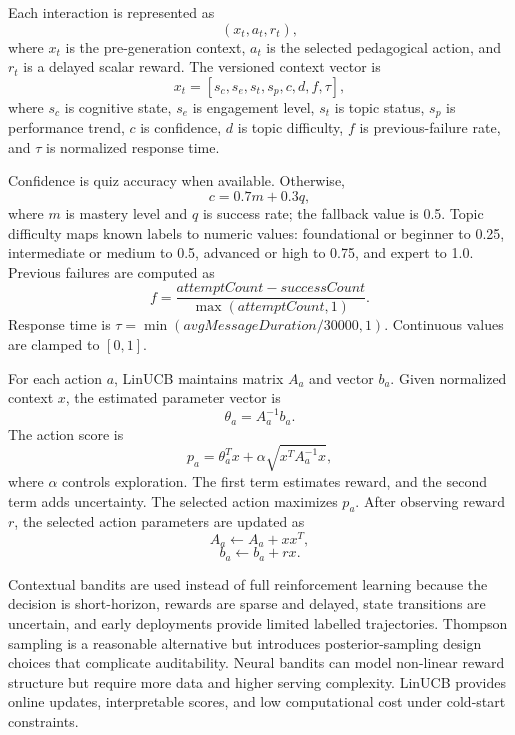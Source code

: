 \documentclass[conference]{IEEEtran}
\begin{document}
Each interaction is represented as
\begin{equation}
(x_t, a_t, r_t),
\end{equation}
where $x_t$ is the pre-generation context, $a_t$ is the selected pedagogical action, and $r_t$ is a delayed scalar reward. The versioned context vector is
\begin{equation}
x_t = [s_c, s_e, s_t, s_p, c, d, f, \tau],
\end{equation}
where $s_c$ is cognitive state, $s_e$ is engagement level, $s_t$ is topic status, $s_p$ is performance trend, $c$ is confidence, $d$ is topic difficulty, $f$ is previous-failure rate, and $\tau$ is normalized response time.

Confidence is quiz accuracy when available. Otherwise,
\begin{equation}
c = 0.7m + 0.3q,
\end{equation}
where $m$ is mastery level and $q$ is success rate; the fallback value is 0.5. Topic difficulty maps known labels to numeric values: foundational or beginner to 0.25, intermediate or medium to 0.5, advanced or high to 0.75, and expert to 1.0. Previous failures are computed as
\begin{equation}
f = \frac{attemptCount - successCount}{\max(attemptCount, 1)}.
\end{equation}
Response time is $\tau = \min(avgMessageDuration/30000, 1)$. Continuous values are clamped to $[0, 1]$.

For each action $a$, LinUCB maintains matrix $A_a$ and vector $b_a$. Given normalized context $x$, the estimated parameter vector is
\begin{equation}
\theta_a = A_a^{-1} b_a.
\end{equation}
The action score is
\begin{equation}
p_a = \theta_a^T x + \alpha \sqrt{x^T A_a^{-1}x},
\end{equation}
where $\alpha$ controls exploration. The first term estimates reward, and the second term adds uncertainty. The selected action maximizes $p_a$. After observing reward $r$, the selected action parameters are updated as
\begin{equation}
A_a \leftarrow A_a + xx^T,
\end{equation}
\begin{equation}
b_a \leftarrow b_a + rx.
\end{equation}

Contextual bandits are used instead of full reinforcement learning because the decision is short-horizon, rewards are sparse and delayed, state transitions are uncertain, and early deployments provide limited labelled trajectories. Thompson sampling is a reasonable alternative but introduces posterior-sampling design choices that complicate auditability. Neural bandits can model non-linear reward structure but require more data and higher serving complexity. LinUCB provides online updates, interpretable scores, and low computational cost under cold-start constraints.
\end{document}
